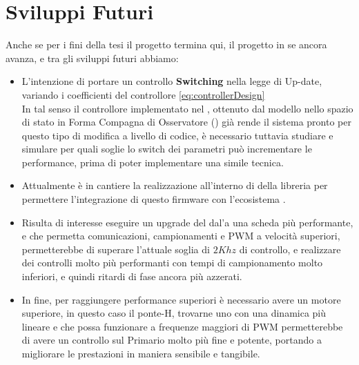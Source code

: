 \section*{Sviluppi Futuri}
Anche se per i fini della tesi il progetto termina qui, il progetto in se ancora avanza, e tra gli sviluppi futuri abbiamo:
\begin{itemize}
	\item L'intenzione di portare un controllo \textbf{Switching} nella legge di Up-date, variando i coefficienti del controllore \ref{eq:controllerDesign}\\
	In tal senso il controllore implementato nel \microControllore, ottenuto dal modello nello spazio di stato in Forma Compagna di Osservatore (\cite{FormeCanoniche}) già rende il sistema pronto per questo tipo di modifica a livello di codice, è necessario tuttavia studiare e simulare per quali soglie lo switch dei parametri può incrementare le performance, prima di poter implementare una simile tecnica.
	\item Attualmente è in cantiere la realizzazione all'interno di \MARTe della libreria \cite*{EMP} per permettere l'integrazione di questo firmware con l'ecosistema \MARTe.
	\item Risulta di interesse eseguire un upgrade del \microControllore dal'\ArduinoUno a una scheda più performante, e che permetta comunicazioni, campionamenti e PWM a velocità superiori, permetterebbe di superare l'attuale soglia di $ 2Khz $ di controllo, e realizzare dei controlli molto più performanti con tempi di campionamento molto inferiori, e quindi ritardi di fase ancora più azzerati.
	\item In fine, per raggiungere performance superiori è necessario avere un motore superiore, in questo caso il ponte-H, trovarne uno con una dinamica più lineare e che possa funzionare a frequenze maggiori di PWM permetterebbe di avere un controllo sul Primario molto più fine e potente, portando a migliorare le prestazioni in maniera sensibile e tangibile.
	
\end{itemize}





